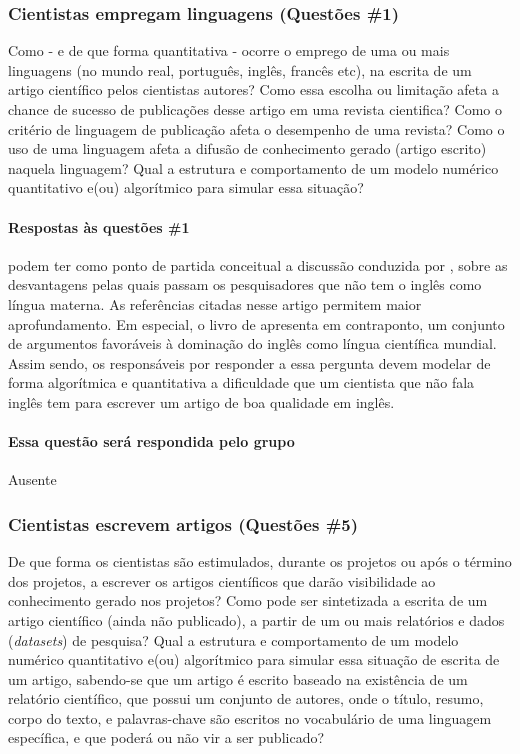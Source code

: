 \subsubsection{Cientistas empregam linguagens (Questões \#1)}
Como - e de que forma quantitativa - ocorre o emprego de uma ou mais linguagens (no mundo real, português, inglês, francês etc), na escrita de um artigo científico pelos cientistas autores? Como essa escolha ou limitação afeta a chance de sucesso de publicações desse artigo em uma revista cientifica? Como o critério de linguagem de publicação afeta o desempenho de uma revista? Como o uso de uma linguagem afeta a difusão de conhecimento gerado (artigo escrito) naquela linguagem? Qual a estrutura e comportamento de um modelo numérico quantitativo e(ou) algorítmico para simular essa situação?

\paragraph{Respostas às questões \#1} podem ter como ponto de partida conceitual a discussão conduzida por \cite{ramirez-castaneda_disadvantages_2020}, sobre as desvantagens pelas quais passam os pesquisadores que não tem o inglês como língua materna. As referências citadas nesse artigo permitem maior aprofundamento. Em especial, o livro de \cite{gordin_scientific_2015} apresenta em contraponto, um conjunto de argumentos favoráveis à dominação do inglês como língua científica mundial.
Assim sendo, os responsáveis por responder a essa pergunta devem modelar de forma algorítmica e quantitativa a dificuldade que um cientista que não fala inglês tem para escrever um artigo de boa qualidade em inglês.

\paragraph{Essa questão será respondida pelo grupo}
Ausente

\subsubsection{Cientistas escrevem artigos (Questões \#5)} De que forma os cientistas são estimulados, durante os projetos ou após o término dos projetos, a escrever os artigos científicos que darão visibilidade ao conhecimento gerado nos projetos?  Como pode ser sintetizada a escrita de um artigo científico (ainda não publicado), a partir de um ou mais relatórios e dados (\textit{datasets}) de pesquisa? Qual a estrutura e comportamento de um modelo numérico quantitativo e(ou) algorítmico para simular essa situação de escrita de um artigo, sabendo-se que um artigo é escrito baseado na existência de um relatório científico, que possui um conjunto de autores, onde o título, resumo, corpo do texto, e palavras-chave são escritos no vocabulário de uma linguagem específica, e que poderá ou não vir a ser publicado?

